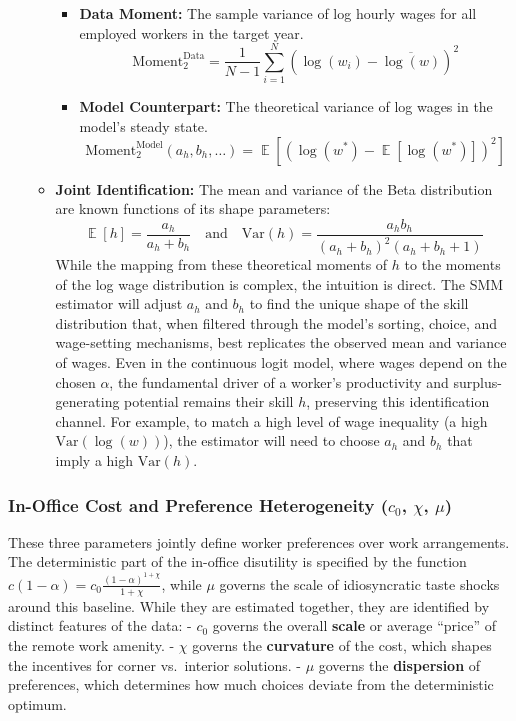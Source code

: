 \documentclass[
  11pt,
  letterpaper,
  DIV=11,
  numbers=noendperiod]{scrartcl}
\providecommand{\tightlist}{%
  \setlength{\itemsep}{0pt}\setlength{\parskip}{0pt}}\usepackage{longtable,booktabs,array}
\DeclareMathOperator*{\Exp}{\mathbb{E}} %
\begin{document}
\begin{itemize}
\begin{itemize}
    \begin{itemize}
    \tightlist
    \item
      \textbf{Data Moment:} The sample variance of log hourly wages for
      all employed workers in the target year.
      \[\text{Moment}_2^{\text{Data}} = \frac{1}{N-1} \sum_{i=1}^{N} (\log(w_i) - \overline{\log(w)})^2\]
    \item
      \textbf{Model Counterpart:} The theoretical variance of log wages
      in the model's steady state.
      \[\text{Moment}_2^{\text{Model}}(a_h, b_h, \dots) = \Exp\left[ (\log(w^*) - \Exp[\log(w^*)])^2 \right]\]
    \end{itemize}
  \item
    \textbf{Joint Identification:} The mean and variance of the Beta
    distribution are known functions of its shape parameters:
    \[\Exp[h] = \frac{a_h}{a_h + b_h} \quad \text{and} \quad \text{Var}(h) = \frac{a_h b_h}{(a_h + b_h)^2 (a_h + b_h + 1)}\]
    While the mapping from these theoretical moments of \(h\) to the
    moments of the log wage distribution is complex, the intuition is
    direct. The SMM estimator will adjust \(a_h\) and \(b_h\) to find
    the unique shape of the skill distribution that, when filtered
    through the model's sorting, choice, and wage-setting mechanisms,
    best replicates the observed mean and variance of wages. Even in the
    continuous logit model, where wages depend on the chosen \(\alpha\),
    the fundamental driver of a worker's productivity and
    surplus-generating potential remains their skill \(h\), preserving
    this identification channel. For example, to match a high level of
    wage inequality (a high \(\text{Var}(\log(w))\)), the estimator will
    need to choose \(a_h\) and \(b_h\) that imply a high
    \(\text{Var}(h)\).
  \end{itemize}
\end{itemize}

\subsubsection{\texorpdfstring{\textbf{In-Office Cost and Preference
Heterogeneity (\(c_{0}\), \(\chi\),
\(\mu\))}}{In-Office Cost and Preference Heterogeneity (c\_\{0\}, \textbackslash chi, \textbackslash mu)}}\label{in-office-cost-and-preference-heterogeneity-c_0-chi-mu}

These three parameters jointly define worker preferences over work
arrangements. The deterministic part of the in-office disutility is
specified by the function
\(c(1-\alpha) = c_{0} \frac{(1-\alpha)^{1+\chi}}{1+\chi}\), while
\(\mu\) governs the scale of idiosyncratic taste shocks around this
baseline. While they are estimated together, they are identified by
distinct features of the data: - \(c_{0}\) governs the overall
\textbf{scale} or average ``price'' of the remote work amenity. -
\(\chi\) governs the \textbf{curvature} of the cost, which shapes the
incentives for corner vs.~interior solutions. - \(\mu\) governs the
\textbf{dispersion} of preferences, which determines how much choices
deviate from the deterministic optimum.
\end{document}
